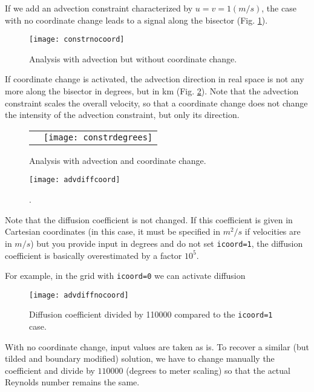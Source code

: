 If we add an advection constraint characterized by $u=v=1 (m/s)$, the case with no coordinate change leads to a signal along the bisector (Fig. \ref{fig:constrnocoord}).


\begin{figure}[H]
\centering
\parbox{.6\textwidth}{
\texttt{[image: constrnocoord]}
}\parbox{.4\textwidth}{
\caption{Analysis with advection but without coordinate change.\label{fig:constrnocoord}}
}
\end{figure}


If coordinate change is activated, the advection direction in real space is not any more along the bisector in degrees, but in km (Fig. \ref{fig:constrdegrees}). Note that the advection constraint scales the overall velocity, so that a coordinate change does not change the intensity of the advection constraint, but only its direction.


\begin{figure}[H]
\centering
\begin{tabular}{cc}
\raisebox{.2\textwidth}{\texttt{[image: constrdegrees]}}&\texttt{[image: constrdegrees]}
\end{tabular}
\caption{Analysis with advection and coordinate change.\label{fig:constrdegrees}}
\end{figure}




\begin{figure}[H]
\centering
\texttt{[image: advdiffcoord]}
\caption{.}
\end{figure}


Note that the diffusion coefficient is not changed. If this coefficient is given in 
Cartesian coordinates (in this case, it must be specified in $m^2/s$ if 
velocities are in $m/s$) but you provide input in degrees and do not set 
\texttt{icoord=1}, the diffusion coefficient is basically overestimated by a 
factor $10^5$.


For example, in the grid with \texttt{icoord=0} we can activate diffusion

\begin{figure}[H]
\centering
\texttt{[image: advdiffnocoord]}
\caption{Diffusion coefficient divided by 110000 compared to the 
\texttt{icoord=1} case.}
\end{figure}


With no coordinate change, input values are taken as is. To recover a similar (but tilded and boundary modified) solution, we have to change manually the coefficient and divide by $110000$ (degrees to meter scaling) so that the actual Reynolds number remains the same.


